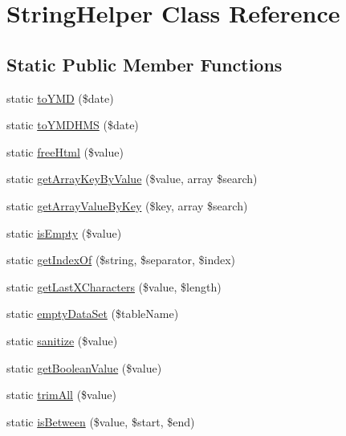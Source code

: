 \hypertarget{class_string_helper}{}\section{String\+Helper Class Reference}
\label{class_string_helper}
\subsection*{Static Public Member Functions}
\begin{DoxyCompactItemize}
\item 
static \hyperlink{class_string_helper_a969afa28cd7ea07c4ff799d3cb79c6b3}{to\+Y\+M\+D} (\$date)
\item 
static \hyperlink{class_string_helper_a75a238a5d05b6bfd7f5f2317c3243147}{to\+Y\+M\+D\+H\+M\+S} (\$date)
\item 
static \hyperlink{class_string_helper_acf1092fbcbe0dbfe40ff406a3d547e09}{free\+Html} (\$value)
\item 
static \hyperlink{class_string_helper_a8b2b123f930fc37cf0a8a1f74b0b49e1}{get\+Array\+Key\+By\+Value} (\$value, array \$search)
\item 
static \hyperlink{class_string_helper_a4dedf3e5fd489794c9b7e2c8e789c38b}{get\+Array\+Value\+By\+Key} (\$key, array \$search)
\item 
static \hyperlink{class_string_helper_aed087bcf64f722ec0e9fa25c84eae9f4}{is\+Empty} (\$value)
\item 
static \hyperlink{class_string_helper_a0c1e84ed575147d3618ea72a9cc8ba4a}{get\+Index\+Of} (\$string, \$separator, \$index)
\item 
static \hyperlink{class_string_helper_ab684a49d435cbda6c86ec2625b3191d2}{get\+Last\+X\+Characters} (\$value, \$length)
\item 
static \hyperlink{class_string_helper_abe85c8c2a1f18ac2eb355357dda6f1c9}{empty\+Data\+Set} (\$table\+Name)
\item 
static \hyperlink{class_string_helper_aa180f95a336ba06f5696ee7d5f582871}{sanitize} (\$value)
\item 
static \hyperlink{class_string_helper_a9deac24c83d5b68afe4433a924118045}{get\+Boolean\+Value} (\$value)
\item 
static \hyperlink{class_string_helper_a7aed2bb2551505fdccbd43decdbd8271}{trim\+All} (\$value)
\item 
static \hyperlink{class_string_helper_a5be0ba5e17ce2cccd15446276872f8b4}{is\+Between} (\$value, \$start, \$end)
\item 

\end{DoxyCompactItemize}
